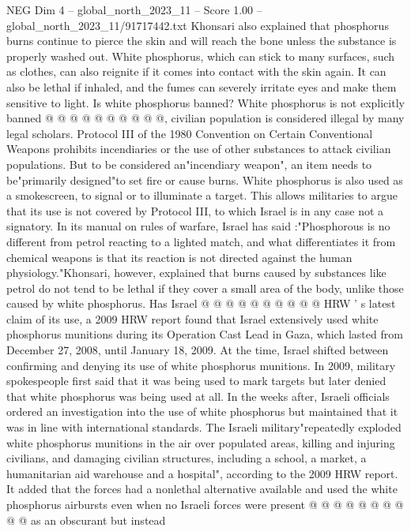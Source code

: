 \begin{textsample}{NEG Dim 4 – global\_north\_2023\_11 – Score 1.00 – global\_north\_2023\_11/91717442.txt}
Khonsari also explained that phosphorus burns continue to pierce the skin and will reach the bone unless the substance is properly washed out.
White phosphorus, which can stick to many surfaces, such as clothes, can also reignite if it comes into contact with the skin again.
It can also be lethal if inhaled, and the fumes can severely irritate eyes and make them sensitive to light.
Is white phosphorus banned?
White phosphorus is not explicitly banned @ @ @ @ @ @ @ @ @ @, civilian population is considered illegal by many legal scholars.
Protocol III of the 1980 Convention on Certain Conventional Weapons prohibits incendiaries or the use of other substances to attack civilian populations.
But to be considered an"incendiary weapon", an item needs to be"primarily designed"to set fire or cause burns.
White phosphorus is also used as a smokescreen, to signal or to illuminate a target.
This allows militaries to argue that its use is not covered by Protocol III, to which Israel is in any case not a signatory.
In its manual on rules of warfare, Israel has said :"Phosphorous is no different from petrol reacting to a lighted match, and what differentiates it from chemical weapons is that its reaction is not directed against the human physiology."Khonsari, however, explained that burns caused by substances like petrol do not tend to be lethal if they cover a small area of the body, unlike those caused by white phosphorus.
Has Israel @ @ @ @ @ @ @ @ @ @ HRW ' s latest claim of its use, a 2009 HRW report found that Israel extensively used white phosphorus munitions during its Operation Cast Lead in Gaza, which lasted from December 27, 2008, until January 18, 2009.
At the time, Israel shifted between confirming and denying its use of white phosphorus munitions.
In 2009, military spokespeople first said that it was being used to mark targets but later denied that white phosphorus was being used at all.
In the weeks after, Israeli officials ordered an investigation into the use of white phosphorus but maintained that it was in line with international standards.
The Israeli military"repeatedly exploded white phosphorus munitions in the air over populated areas, killing and injuring civilians, and damaging civilian structures, including a school, a market, a humanitarian aid warehouse and a hospital", according to the 2009 HRW report.
It added that the forces had a nonlethal alternative available and used the white phosphorus airbursts even when no Israeli forces were present @ @ @ @ @ @ @ @ @ @ as an obscurant but instead

\end{textsample}
